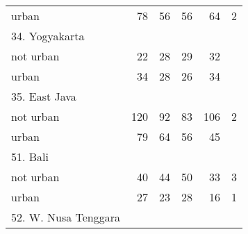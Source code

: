 \begin{table}[!h]
\begin{tabular}{llllll}
\multicolumn{1}{l}{\hspace{1em}urban} &
  \multicolumn{1}{|r}{78} &
  \multicolumn{1}{r}{56} &
  \multicolumn{1}{r}{56} &
  \multicolumn{1}{r}{64} &
  \multicolumn{1}{r}{2} \\
\multicolumn{1}{l}{34. Yogyakarta} &
  \multicolumn{1}{|r}{} &
  \multicolumn{1}{r}{} &
  \multicolumn{1}{r}{} &
  \multicolumn{1}{r}{} &
  \multicolumn{1}{r}{} \\
\multicolumn{1}{l}{\hspace{1em}not urban} &
  \multicolumn{1}{|r}{22} &
  \multicolumn{1}{r}{28} &
  \multicolumn{1}{r}{29} &
  \multicolumn{1}{r}{32} &
  \multicolumn{1}{r}{} \\
\multicolumn{1}{l}{\hspace{1em}urban} &
  \multicolumn{1}{|r}{34} &
  \multicolumn{1}{r}{28} &
  \multicolumn{1}{r}{26} &
  \multicolumn{1}{r}{34} &
  \multicolumn{1}{r}{} \\
\multicolumn{1}{l}{35. East Java} &
  \multicolumn{1}{|r}{} &
  \multicolumn{1}{r}{} &
  \multicolumn{1}{r}{} &
  \multicolumn{1}{r}{} &
  \multicolumn{1}{r}{} \\
\multicolumn{1}{l}{\hspace{1em}not urban} &
  \multicolumn{1}{|r}{120} &
  \multicolumn{1}{r}{92} &
  \multicolumn{1}{r}{83} &
  \multicolumn{1}{r}{106} &
  \multicolumn{1}{r}{2} \\
\multicolumn{1}{l}{\hspace{1em}urban} &
  \multicolumn{1}{|r}{79} &
  \multicolumn{1}{r}{64} &
  \multicolumn{1}{r}{56} &
  \multicolumn{1}{r}{45} &
  \multicolumn{1}{r}{} \\
\multicolumn{1}{l}{51. Bali} &
  \multicolumn{1}{|r}{} &
  \multicolumn{1}{r}{} &
  \multicolumn{1}{r}{} &
  \multicolumn{1}{r}{} &
  \multicolumn{1}{r}{} \\
\multicolumn{1}{l}{\hspace{1em}not urban} &
  \multicolumn{1}{|r}{40} &
  \multicolumn{1}{r}{44} &
  \multicolumn{1}{r}{50} &
  \multicolumn{1}{r}{33} &
  \multicolumn{1}{r}{3} \\
\multicolumn{1}{l}{\hspace{1em}urban} &
  \multicolumn{1}{|r}{27} &
  \multicolumn{1}{r}{23} &
  \multicolumn{1}{r}{28} &
  \multicolumn{1}{r}{16} &
  \multicolumn{1}{r}{1} \\
\multicolumn{1}{l}{52. W. Nusa Tenggara} &
  \multicolumn{1}{|r}{} &
  \multicolumn{1}{r}{} &
  \multicolumn{1}{r}{} &
  \multicolumn{1}{r}{} &
  \multicolumn{1}{r}{} \\

\end{tabular}
\end{table}
